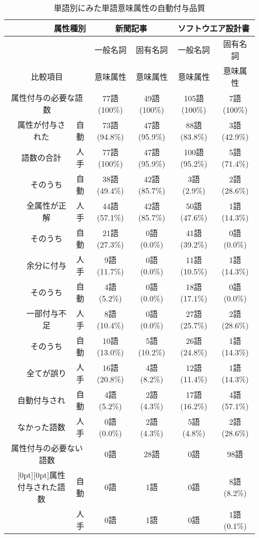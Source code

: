 \begin{table}[htbp]
  \caption{単語別にみた単語意味属性の自動付与品質}
  \label{tab:5}
  \begin{center}
    \leavevmode
    \begin{tabular}{|l|l|c|c|c|c|c|c|}
      \hline
      \multicolumn{4}{|r|}{属性種別} & \multicolumn{2}{|c|}{新聞記事} &  \multicolumn{2}{|c|}{ソフトウエア設計書}  \\  \hline
       \multicolumn{4}{|r|}{} & 一般名詞 & 固有名詞 & 一般名詞 & 固有名詞 \\ 
       \multicolumn{4}{|c|}{比較項目} & 意味属性 & 意味属性 & 意味属性 & 意味属性 \\ \hline
       \multicolumn{4}{|c|}{属性付与の必要な語数} & 77語(100\%) & 49語(100\%) & 105語(100\%) & 7語(100\%) \\ \cline{2-8}
       \hspace{4mm} & \multicolumn{2}{|c|}{属性が付与された} & 自動 & 73語(94.8\%) & 47語(95.9\%) & 88語(83.8\%) & 3語(42.9\%) \\
       & \multicolumn{2}{|c|}{語数の合計} & 人手 & 77語(100\%) & 47語(95.9\%) & 100語(95.2\%) & 5語(71.4\%) \\ \cline{2-8}
       & \hspace{4mm} & そのうち & 自動 & 38語(49.4\%) & 42語(85.7\%) & 3語(2.9\%) & 2語(28.6\%) \\
       & & 全属性が正解 & 人手 & 44語(57.1\%) & 42語(85.7\%) & 50語(47.6\%) & 1語(14.3\%) \\ \cline{3-8}
       & &  そのうち & 自動 & 21語(27.3\%) & 0語(0.0\%) & 41語(39.2\%) & 0語(0.0\%) \\
       & & 余分に付与 & 人手 & 9語(11.7\%) & 0語(0.0\%) & 11語(10.5\%) & 1語(14.3\%) \\  \cline{3-8}
       & & そのうち & 自動 & 4語(5.2\%) & 0語(0.0\%) & 18語(17.1\%) & 0語(0.0\%) \\
       & & 一部付与不足 & 人手 & 8語(10.4\%) & 0語(0.0\%) & 27語(25.7\%) & 2語(28.6\%) \\ \cline{3-8}
       & & そのうち & 自動 & 10語(13.0\%) & 5語(10.2\%) & 26語(24.8\%) & 1語(14.3\%) \\
       & & 全てが誤り & 人手 & 16語(20.8\%) & 4語(8.2\%) & 12語(11.4\%) & 1語(14.3\%) \\ \cline{2-8}
       & \multicolumn{2}{|c|}{自動付与され} & 自動 & 4語(5.2\%) & 2語(4.3\%) & 17語(16.2\%) & 4語(57.1\%) \\
       & \multicolumn{2}{|c|}{なかった語数} & 人手 & 0語(0.0\%) & 2語(4.3\%) & 5語(4.8\%) & 2語(28.6\%) \\ \hline
       \multicolumn{4}{|c|}{属性付与の必要ない語数} & 0語 & 28語 & 0語 & 98語 \\ \cline{2-8}
       & \multicolumn{2}{|c|}{\raisebox{-6pt}[0pt][0pt]{属性付与された語数}} & 自動 & 0語 & 1語 & 0語 & 8語(8.2\%) \\
       & \multicolumn{2}{|c|}{} & 人手 & 0語 & 1語 & 0語 & 1語(0.1\%) \\ \hline
    \end{tabular}
\vspace{-3mm} 
  \end{center}
\end{table}


